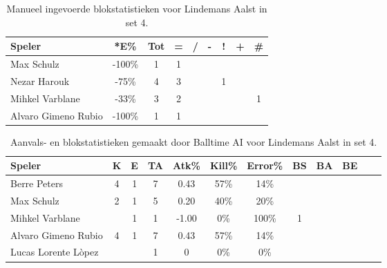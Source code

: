 \begin{table}[ht!]
    \centering
    \scriptsize
    \begin{tabular}{|l|c|c|c|c|c|c|c|c|}
        \hline
        \textbf{Speler} & *E\% & Tot & = & / & - & ! & + & \# \\ \hline
        Max Schulz & -100\% & 1 & 1 &  &  &  &  & \\
        Nezar Harouk & -75\% & 4 & 3 & &  & 1 &  & \\ 
        Mihkel Varblane & -33\% & 3 & 2 &  &  & &  & 1 \\ 
        Alvaro Gimeno Rubio & -100\% & 1 & 1 &  &  &  &  & \\  \hline
    \end{tabular}
    \caption[Manueel ingevoerde blokstatistieken voor Lindemans Aalst in set 4]{\label{tab:PL3BlockAalstMan4}Manueel ingevoerde blokstatistieken voor Lindemans Aalst in set 4.}
\end{table}

\begin{table}[ht!]
  \centering
  \scriptsize
  \begin{tabular}{|l|c|c|c|c|c|c|c|c|c|c|c|} \hline
    \textbf{Speler} &  K & E & TA & Atk\% & Kill\% & Error\% & BS & BA & BE \\ \hline
    Berre Peters & 4 & 1 & 7 & 0.43 & 57\% & 14\% &  &  & \\
    Max Schulz & 2 & 1 & 5 & 0.20 & 40\% & 20\% &  &  & \\
    Mihkel Varblane &  & 1 & 1 & -1.00 & 0\% & 100\% & 1 & & \\
    Alvaro Gimeno Rubio & 4 & 1 & 7 & 0.43 & 57\% & 14\% &  &  & \\
    Lucas Lorente Lòpez &  &  & 1 & 0 & 0\% & 0\% &  &  &\\ \hline
  \end{tabular}
  \caption[Aanvals- en blokstatistieken gemaakt door Balltime AI voor Lindemans Aalst in set 4]{\label{tab:PL3AttBlockAalstAI4}Aanvals- en blokstatistieken gemaakt door Balltime AI voor Lindemans Aalst in set 4.}
\end{table}
